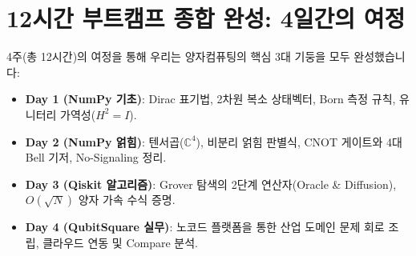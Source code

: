 \documentclass[11pt, a4paper]{article}
\theoremstyle{definition}
\begin{document}
\section{12시간 부트캠프 종합 완성: 4일간의 여정}
4주(총 12시간)의 여정을 통해 우리는 양자컴퓨팅의 핵심 3대 기둥을 모두 완성했습니다:
\begin{itemize}
    \item \textbf{Day 1 (NumPy 기초)}: Dirac 표기법, 2차원 복소 상태벡터, Born 측정 규칙, 유니터리 가역성($H^2=I$).
    \item \textbf{Day 2 (NumPy 얽힘)}: 텐서곱($\mathbb{C}^4$), 비분리 얽힘 판별식, CNOT 게이트와 4대 Bell 기저, No-Signaling 정리.
    \item \textbf{Day 3 (Qiskit 알고리즘)}: Grover 탐색의 2단계 연산자(Oracle \& Diffusion), $O(\sqrt{N})$ 양자 가속 수식 증명.
    \item \textbf{Day 4 (QubitSquare 실무)}: 노코드 플랫폼을 통한 산업 도메인 문제 회로 조립, 클라우드 연동 및 Compare 분석.
\end{itemize}
\end{document}
